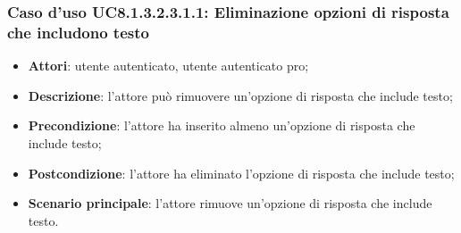 \subsubsection{Caso d'uso UC8.1.3.2.3.1.1: Eliminazione opzioni di risposta che includono testo}
		\begin{itemize}
		\item
			\textbf{Attori}: utente autenticato, utente autenticato pro;
		\item		
			\textbf{Descrizione}: l'attore può rimuovere un'opzione di risposta che include testo;
		\item
			\textbf{Precondizione}: l'attore ha inserito almeno un'opzione di risposta che include testo;
		\item
			\textbf{Postcondizione}: l'attore ha eliminato l'opzione di risposta che include testo;
		\item
			\textbf{Scenario principale}: l'attore rimuove un'opzione di risposta che include testo.				
		\end{itemize}

